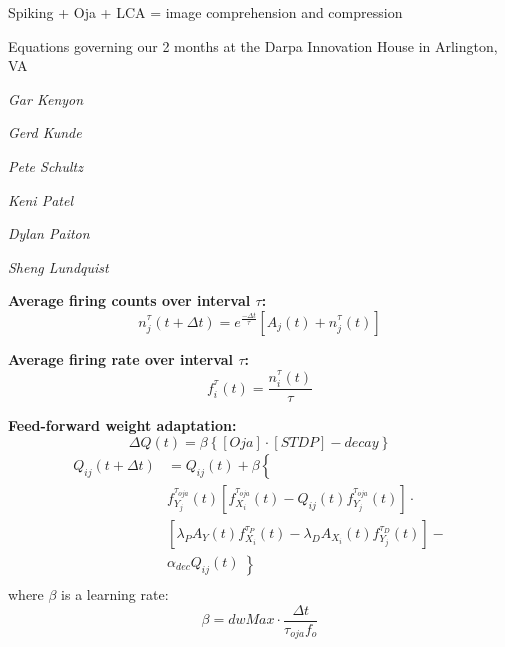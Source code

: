 \documentclass{article}
\def\nterm#1#2{n_{#1}^{\displaystyle{\tau_{#2}}}}
\def\fterm#1#2{f_{#1}^{\displaystyle{\tau_{#2}}}}
\begin{document}
\centerline{\sc \large Spiking + Oja + LCA = image comprehension and compression}
\vspace{.5pc}
\centerline{\sc Equations governing our 2 months at the Darpa Innovation House in Arlington, VA}
\begin{minipage}[t]{0.5\textwidth}
\centerline{\it Gar Kenyon}
\centerline{\it Gerd Kunde}
\centerline{\it Pete Schultz}
\end{minipage}
\begin{minipage}[t]{0.5\textwidth}
\centerline{\it Keni Patel}
\centerline{\it Dylan Paiton}
\centerline{\it Sheng Lundquist}
\end{minipage}

\vspace{1pc}

{\bf Average firing counts over interval $\tau$:}
\begin{equation}\label{avgSpikes}
\nterm{j}{}(t+\Delta t) = e^{\frac{-\Delta t}{\displaystyle{\tau}}} \left[A_{j}(t) + \nterm{j}{}(t)\right]
\end{equation}


{\bf Average firing rate over interval $\tau$:}
\begin{equation}\label{avgRate}
\fterm{i}{}(t) = \frac{\nterm{i}{}(t)}{\tau}
\end{equation}


{\bf Feed-forward weight adaptation:}
\begin{equation}\nonumber
    \Delta Q(t) = \beta \left\{[Oja] \cdot [STDP] - decay\right\}
\end{equation}
\begin{equation}\begin{split}
Q_{ij}(t+\Delta t) &= Q_{ij}(t) + \beta \left\{\right.\\[2mm]
                        &\fterm{Y_j}{oja}(t) \left[\fterm{X_i}{oja}(t) - Q_{ij}(t) \fterm{Y_j}{oja}(t)\right] \cdot\\[2mm]
                        &\left[ \lambda_{P} A_{Y}(t) \fterm{X_{i}}{P}(t) - \lambda_{D} A_{X}_{i}(t) \fterm{Y_{j}}{D}(t)\right] -\\[2mm]
                        &\alpha_{dec} Q_{ij}(t)\left\}\right.\\
\end{split}\end{equation}
where $\beta$ is a learning rate:
\begin{equation}\nonumber
\beta = dwMax \cdot \frac{\Delta t}{\tau_{oja}f_o}
\end{equation}
\end{document}
